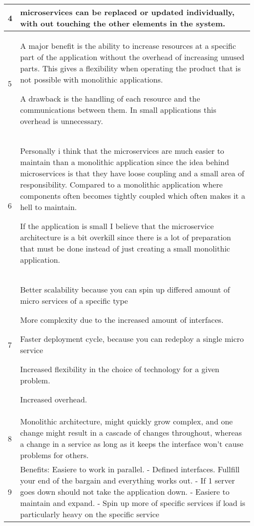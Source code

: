 \begin{longtable}{|p{0.3cm}|p{14.7cm}|}
4 & microservices can be replaced or updated individually, with out touching the other elements in the system. \\ \hline

5 & A major benefit is the ability to increase resources at a specific part of the application without the overhead of increasing unused parts. This gives a flexibility when operating the product that is not possible with monolithic applications.

\noindent A drawback is the handling of each resource and the communications between them. In small applications this overhead is unnecessary. \\ \hline

6 & Personally i think that the microservices are much easier to maintain than a monolithic application since the idea behind microservices is that they have loose coupling and a small area of responsibility. Compared to a monolithic application where components often becomes tightly coupled which often makes it a hell to maintain.

\noindent If the application is small I believe that the microservice architecture is a bit overkill since there is a lot of preparation that must be done instead of just creating a small monolithic application. \\ \hline

7 & Better scalability because you can spin up differed amount of micro services of a specific type

\noindent More complexity due to the increased amount of interfaces.

\noindent Faster deployment cycle, because you can redeploy a single micro service

\noindent Increased flexibility in the choice of technology for a given problem.

\noindent Increased overhead.  \\ \hline

8 & Monolithic architecture, might quickly grow complex, and one change might result in a cascade of changes throughout, whereas a change in a service as long as it keeps the interface won't cause problems for others. \\ \hline

9 & Benefits: Easiere to work in parallel. - Defined interfaces. Fullfill your end of the bargain and everything works out. - If 1 server goes down should not take the application down. - Easiere to maintain and expand. - Spin up more of specific services if load is particularly heavy on the specific service


\end{longtable}
